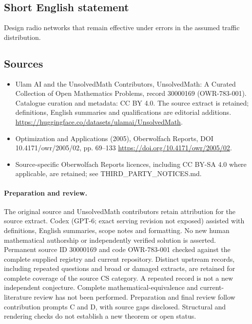\documentclass[11pt]{article}
\begin{document}
\subsection{Short English statement}
Design radio networks that remain effective under errors in the assumed traffic distribution.
\subsection{Sources}
\begin{itemize}
\item[\hypertarget{source:30000169:1}{S1}] Ulam AI and the UnsolvedMath Contributors, UnsolvedMath: A Curated Collection of Open Mathematics Problems, record 30000169 (OWR-783-001). Catalogue curation and metadata: CC BY 4.0. The source extract is retained; definitions, English summaries and qualifications are editorial additions.
\url{https://huggingface.co/datasets/ulamai/UnsolvedMath}.
\item[\hypertarget{source:30000169:2}{S2}] Optimization and Applications (2005), Oberwolfach Reports, DOI 10.4171/owr/2005/02, pp. 69--133
\url{https://doi.org/10.4171/owr/2005/02}.
\item Source-specific Oberwolfach Reports licences, including CC BY-SA 4.0 where applicable, are retained; see THIRD\_PARTY\_NOTICES.md.
\end{itemize}
\paragraph{Preparation and review.}
The original source and UnsolvedMath contributors retain attribution for the source extract. Codex (GPT-6; exact serving revision not exposed) assisted with definitions, English summaries, scope notes and formatting. No new human mathematical authorship or independently verified solution is asserted. Permanent source ID 30000169 and code OWR-783-001 checked against the complete supplied registry and current repository. Distinct upstream records, including repeated questions and broad or damaged extracts, are retained for complete coverage of the source CS category. A repeated record is not a new independent conjecture. Complete mathematical-equivalence and current-literature review has not been performed. Preparation and final review follow contribution prompts C and D, with source gaps disclosed. Structural and rendering checks do not establish a new theorem or open status.
\label{end:30000169}
\end{document}
